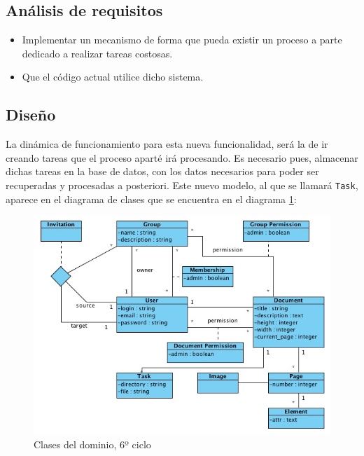 \subsection{Análisis de requisitos} %
\label{sub:análisis_de_requisitos}

\begin{itemize}
  \item Implementar un mecanismo de forma que pueda existir un proceso a parte dedicado a realizar tareas costosas.
  \item Que el código actual utilice dicho sistema.
\end{itemize}


\subsection{Diseño} %
\label{sub:diseño}

La dinámica de funcionamiento para esta nueva funcionalidad, será la de ir creando tareas que el proceso aparté irá procesando. Es necesario pues, almacenar dichas tareas en la base de datos, con los datos necesarios para poder ser recuperadas y procesadas a posteriori. Este nuevo modelo, al que se llamará \texttt{Task}, aparece en el diagrama de clases que se encuentra en el diagrama \ref{fig:uml6}:

\begin{figure}[h!]
\centering
\includegraphics[width=14cm]{uml6.png}
\caption{Clases del dominio, 6º ciclo}\label{fig:uml6}
\end{figure}

